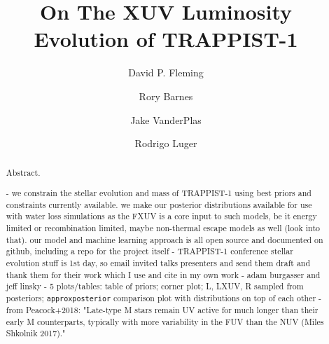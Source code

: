\documentclass[twocolumn]{aastex62}
\newcommand{\approxposterior}[0]{\texttt{approxposterior}\xspace}
\begin{document}
\title{On The XUV Luminosity Evolution of TRAPPIST-1}



\author{David P. Fleming}

\author{Rory Barnes}

\author{Jake VanderPlas}

\author{Rodrigo Luger}


\begin{abstract}

Abstract.

- we constrain the stellar evolution and mass of TRAPPIST-1 using best priors and constraints currently available. we make our posterior distributions available for use with water loss simulations as the FXUV is a core input to such models, be it energy limited or recombination limited, maybe non-thermal escape models as well (look into that). our model and machine learning approach is all open source and documented on github, including a repo for the project itself
- TRAPPIST-1 conference stellar evolution stuff is 1st day, so email invited talks presenters and send them draft and thank them for their work which I use and cite in my own work - adam burgasser and jeff linsky
- 5 plots/tables: table of priors; corner plot; L, LXUV, R sampled from posteriors; \approxposterior comparison plot with distributions on top of each other 
- from Peacock+2018: "Late-type M stars remain UV active for much longer than their early M counterparts, typically with more variability in the FUV than the NUV (Miles Shkolnik 2017)."

\end{abstract}
\end{document}

